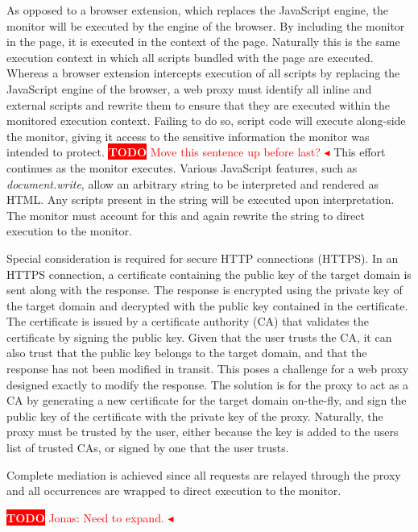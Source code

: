 \documentclass{llncs}
\newcommand{\todo}[1]{\colorbox{red}{\textcolor{white}{\sffamily\bfseries\scriptsize TODO}} \textcolor{red}{#1} \textcolor{red}{$\blacktriangleleft$}}
\begin{document}
As opposed to a browser extension, which replaces the 
JavaScript engine, the monitor will be executed by the engine of the browser. 
By including the monitor in the page, it is executed in the context of the page. Naturally 
this is the same execution context in which all scripts bundled with the 
page are executed. Whereas a 
browser extension intercepts execution of all scripts by replacing the JavaScript 
engine of the browser, a web proxy must identify all inline and 
external scripts and rewrite them to ensure that they are executed within the 
monitored execution context. Failing to do so, script code will execute 
along-side the monitor, giving it access to the sensitive information the 
monitor was intended to protect. 
\todo{Move this sentence up before last?}
This effort continues as the monitor executes. Various JavaScript features, such as 
\emph{document.write}, allow an arbitrary string to be 
interpreted and rendered as HTML. Any scripts present in the string will be 
executed upon interpretation. The monitor must account for this and again rewrite 
the string to direct execution to the monitor.

Special consideration is required for secure HTTP connections (HTTPS). In an HTTPS 
connection, a certificate containing the public key of the target domain is sent 
along with the response. The response is encrypted using the private key of the target 
domain and decrypted with the public key contained in the certificate. The 
certificate is issued by a certificate authority (CA)
that validates the certificate by signing the public key. Given that the user 
trusts the CA, it can also trust that the public key belongs 
to the target domain, and that the response has not been modified in transit.
This poses a challenge for a web proxy designed exactly to modify the response. The solution 
is for the proxy to act as a CA by generating a
new certificate for the target domain on-the-fly, and sign the 
public key of the certificate with the private key of the proxy. Naturally, 
the proxy must be trusted by the user, either because the key is added to 
the users list of trusted CAs, or signed by one that the user trusts.

Complete mediation is achieved since all requests are relayed through the proxy 
and all occurrences are wrapped to direct execution to the monitor.

\todo{Jonas: Need to expand.}
\end{document}
